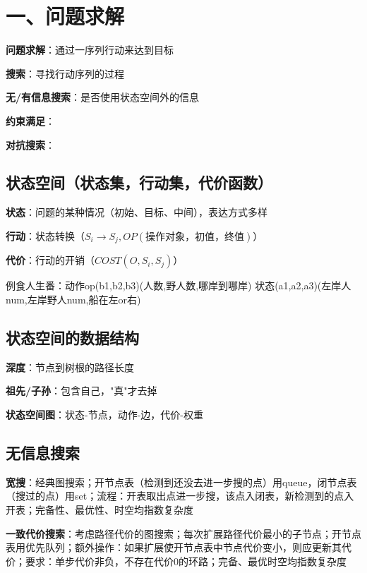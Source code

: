 	\setlength{\abovedisplayskip}{0em}
	\setlength{\belowdisplayskip}{0em}
	
	\section*{一、问题求解}
	
	\textbf{问题求解}：通过一序列行动来达到目标
	
	\textbf{搜索}：寻找行动序列的过程
	
	\textbf{无/有信息搜索}：是否使用状态空间外的信息
	
	\textbf{约束满足}：
	
	\textbf{对抗搜索}：
	
	\subsection*{状态空间（状态集，行动集，代价函数）}
	
	\textbf{状态}：问题的某种情况（初始、目标、中间），表达方式多样
	
	\textbf{行动}：状态转换（$S_i \rightarrow S_j, OP(\text{操作对象，初值，终值})$）
	
	\textbf{代价}：行动的开销（$COST(O, S_i, S_j)$）
	
	例食人生番：动作op(b1,b2,b3)(人数,野人数,哪岸到哪岸)
	状态(a1,a2,a3)(左岸人num,左岸野人num,船在左or右)
	
	\subsection*{状态空间的数据结构}
	
	\textbf{深度}：节点到树根的路径长度
	
	\textbf{祖先/子孙}：包含自己，"真"才去掉
	
	\textbf{状态空间图}：状态-节点，动作-边，代价-权重
	
	\subsection*{无信息搜索}
	
	\textbf{宽搜}：经典图搜索；开节点表（检测到还没去进一步搜的点）用queue，闭节点表（搜过的点）用set；流程：开表取出点进一步搜，该点入闭表，新检测到的点入开表；完备性、最优性、时空均指数复杂度
	
	\textbf{一致代价搜索}：考虑路径代价的图搜索；每次扩展路径代价最小的子节点；开节点表用优先队列；额外操作：如果扩展使开节点表中节点代价变小，则应更新其代价；要求：单步代价非负，不存在代价0的环路；完备、最优时空均指数复杂度
	
